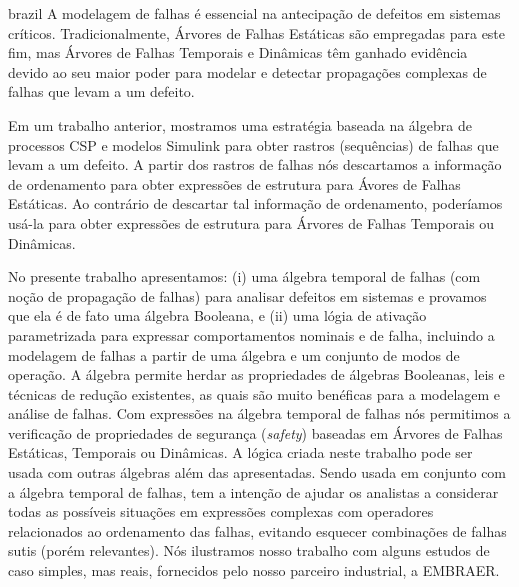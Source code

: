 \documentclass[12pt,openright,twoside,a4paper,oldfontcommands,english,brazil,final]{abntex2}
\theoremstyle{theo}
\begin{document}


\begin{resumo}[Resumo]
\begin{otherlanguage*}{brazil}
A modelagem de falhas é essencial na antecipação de defeitos em sistemas críticos.
Tradicionalmente, Árvores de Falhas Estáticas são empregadas para este fim, mas Árvores de Falhas Temporais e Dinâmicas têm ganhado evidência devido ao seu maior poder para modelar e detectar propagações complexas de falhas que levam a um defeito.

Em um trabalho anterior, mostramos uma estratégia baseada na álgebra de processos CSP e modelos Simulink para obter rastros (sequências) de falhas que levam a um defeito.
A partir dos rastros de falhas nós descartamos a informação de ordenamento para obter expressões de estrutura  para Ávores de Falhas Estáticas.
Ao contrário de descartar tal informação de ordenamento, poderíamos usá-la para obter expressões de estrutura para Árvores de Falhas Temporais ou Dinâmicas.

No presente trabalho apresentamos: (i) uma álgebra temporal de falhas (com noção de propagação de falhas) para analisar defeitos em sistemas e provamos que ela é de fato uma álgebra Booleana, e (ii) uma lógia de ativação parametrizada para expressar comportamentos nominais e de falha, incluindo a modelagem de falhas a partir de uma álgebra e um conjunto de modos de operação.
A álgebra permite herdar as propriedades de álgebras Booleanas, leis e técnicas de redução existentes, as quais são muito benéficas para a modelagem e análise de falhas.
Com expressões na álgebra temporal de falhas nós permitimos a verificação de propriedades de segurança (\emph{safety}) baseadas em Árvores de Falhas Estáticas, Temporais ou Dinâmicas.
A lógica criada neste trabalho pode ser usada com outras álgebras além das apresentadas.
Sendo usada em conjunto com a álgebra temporal de falhas, tem a intenção de ajudar os analistas a considerar todas as possíveis situações em expressões complexas com operadores relacionados ao ordenamento das falhas, evitando esquecer combinações de falhas sutis (porém relevantes).
Nós ilustramos nosso trabalho com alguns estudos de caso simples, mas reais, fornecidos pelo nosso parceiro industrial, a EMBRAER.


\end{otherlanguage*}
\end{resumo}
\end{document}

